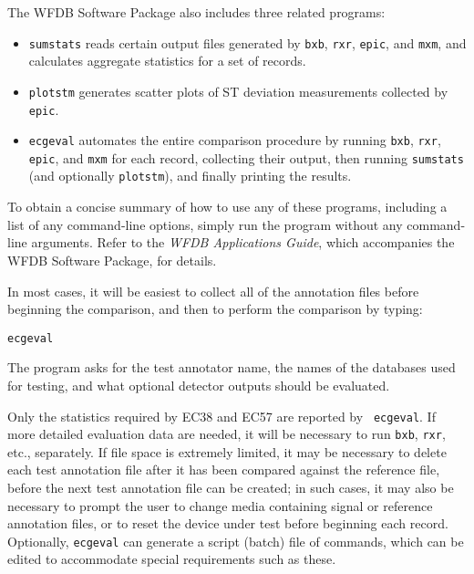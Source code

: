 \documentclass[twoside]{article}
\begin{document}
The WFDB Software Package also includes three related programs:
\begin{itemize}
   \item {\tt sumstats} reads certain output files generated by {\tt bxb},
{\tt rxr}, {\tt epic}, and {\tt mxm}, and calculates aggregate statistics for
a set of records.
   \item {\tt plotstm} generates scatter plots of ST deviation measurements
collected by {\tt epic}.
   \item {\tt ecgeval} automates the entire comparison procedure by running
{\tt bxb}, {\tt rxr}, {\tt epic}, and {\tt mxm} for each record, collecting
their output, then running {\tt sumstats} (and optionally {\tt plotstm}), and
finally printing the results.
\end{itemize}

To obtain a concise summary of how to use any of these programs, including
a list of any command-line options, simply run the program without any
command-line arguments.  Refer to the {\it WFDB Applications Guide},
which accompanies the WFDB Software Package, for details.

In most cases, it will be easiest to collect all of the annotation files
before beginning the comparison, and then to perform the comparison by typing:
\begin{verbatim}
ecgeval
\end{verbatim}
The program asks for the test annotator name, the names of the databases
used for testing, and what optional detector outputs should be evaluated.

Only the statistics required by EC38 and EC57 are reported by {\tt
ecgeval}.  If more detailed evaluation data are needed, it will be
necessary to run {\tt bxb}, {\tt rxr}, etc., separately.  If file
space is extremely limited, it may be necessary to delete each test
annotation file after it has been compared against the reference file,
before the next test annotation file can be created; in such cases, it
may also be necessary to prompt the user to change media containing
signal or reference annotation files, or to reset the device under
test before beginning each record.  Optionally, {\tt ecgeval} can
generate a script (batch) file of commands, which can be edited to
accommodate special requirements such as these.
\end{document}
